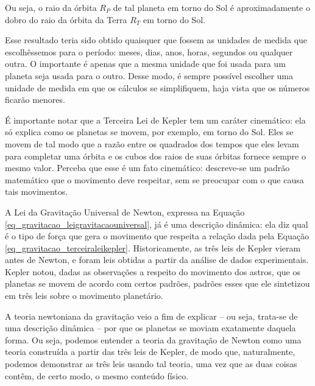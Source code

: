 Ou seja, o raio da órbita $R_P$ de tal planeta em torno do Sol é aproximadamente o dobro do raio da órbita da Terra $R_T$ em torno do Sol.

Esse resultado teria sido obtido quaisquer que fossem as unidades de medida que escolhêssemos para o período: meses, dias, anos, horas, segundos ou qualquer outra. O importante é apenas que a mesma unidade que foi usada para um planeta seja usada para o outro. Desse modo, é sempre possível escolher uma unidade de medida em que os cálculos se simplifiquem, haja vista que os números ficarão menores.





É importante notar que a Terceira Lei de Kepler tem um caráter cinemático: ela só explica como os planetas se movem, por exemplo, em torno do Sol. Eles se movem de tal modo que a razão entre os quadrados dos tempos que eles levam para completar uma órbita e os cubos dos raios de suas órbitas fornece sempre o mesmo valor. Perceba que esse é um fato cinemático: descreve-se um padrão matemático que o movimento deve respeitar, sem se preocupar com o que causa tais movimentos. 

A Lei da Gravitação Universal de Newton, expressa na Equação \eqref{eq_gravitacao_leigravitacaouniversal}, já é uma descrição dinâmica: ela diz qual é o tipo de força que gera o movimento que respeita a relação dada pela Equação \eqref{eq_gravitacao_terceiraleikepler}. Historicamente, as três leis de Kepler vieram antes de Newton, e foram leis obtidas a partir da análise de dados experimentais. Kepler notou, dadas as observações a respeito do movimento dos astros, que os planetas se movem de acordo com certos padrões, padrões esses que ele sintetizou em três leis sobre o movimento planetário.

A teoria newtoniana da gravitação veio a fim de explicar -- ou seja, trata-se de uma descrição dinâmica -- por que os planetas se moviam exatamente daquela forma. Ou seja, podemos entender a teoria da gravitação de Newton como uma teoria construída a partir das três leis de Kepler, de modo que, naturalmente, podemos demonstrar as três leis usando tal teoria, uma vez que as duas coisas contêm, de certo modo, o mesmo conteúdo físico.




